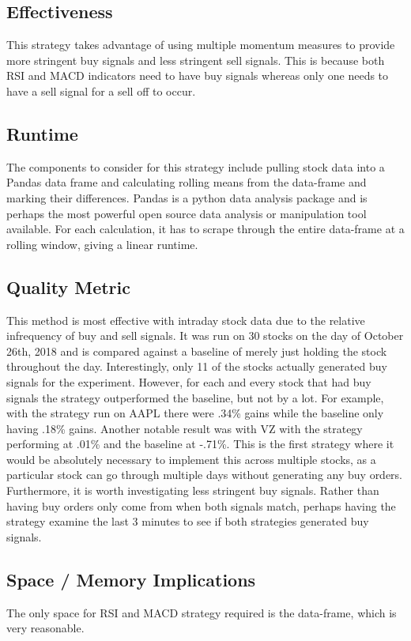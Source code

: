 \documentclass[letterpaper,11pt]{article}
\begin{document}
\subsection*{Effectiveness}
This strategy takes advantage of using multiple momentum measures to provide more stringent buy signals and less stringent sell signals. This is because both RSI and MACD indicators need to have buy signals whereas only one needs to have a sell signal for a sell off to occur.

\subsection*{Runtime}
The components to consider for this strategy include pulling stock data into a Pandas data frame and calculating rolling means from the data-frame and marking their differences. Pandas is a python data analysis package and is perhaps the most powerful open source data analysis or manipulation tool available. For each calculation, it has to scrape through the entire data-frame at a rolling window, giving a linear runtime.

\subsection*{Quality Metric}
This method is most effective with intraday stock data due to the relative infrequency of buy and sell signals. It was run on 30 stocks on the day of October 26th, 2018 and is compared against a baseline of merely just holding the stock throughout the day. Interestingly, only 11 of the stocks actually generated buy signals for the experiment. However, for each and every stock that had buy signals the strategy  outperformed the baseline, but not by a lot. For example, with the strategy run on AAPL there were .34\% gains while the baseline only having .18\% gains. Another notable result was with VZ with the strategy performing at .01\% and the baseline at -.71\%. This is the first strategy where it would be absolutely necessary to implement this across multiple stocks, as a particular stock can go through multiple days without generating any buy orders. Furthermore, it is worth investigating less stringent buy signals. Rather than having buy orders only come from when both signals match, perhaps having the strategy examine the last 3 minutes to see if both strategies generated buy signals.


\subsection*{Space / Memory Implications}
The only space for RSI and MACD strategy required is the data-frame, which is very reasonable.
\end{document}

